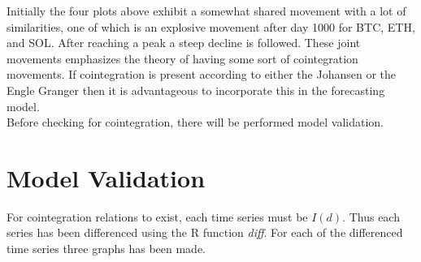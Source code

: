 \noindent Initially the four plots above exhibit a somewhat shared movement with a lot of similarities, one of which is an explosive movement after day 1000 for BTC, ETH, and SOL. After reaching a peak a steep decline is followed. These joint movements emphasizes the theory of having some sort of cointegration movements. If cointegration is present according to either the Johansen or the Engle Granger then it is advantageous to incorporate this in the forecasting model.\\
Before checking for cointegration, there will be performed model validation.


\section{Model Validation}
For cointegration relations to exist, each time series must be $I(d)$. Thus each series has been differenced using the R function \textit{diff}. For each of the differenced time series three graphs has been made.
